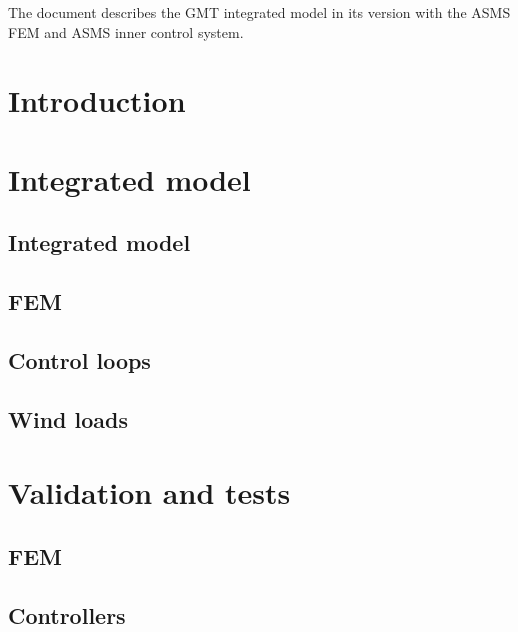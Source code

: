 \documentclass{gmto}
\begin{document}
The document describes the GMT integrated model in its version with the ASMS FEM
and ASMS inner control system.

\section{Introduction}
\label{sec:introduction}

\section{Integrated model}

\subsection{Integrated model}
\label{sec:im}

\subsection{FEM}
\label{sec:fem}








\subsection{Control loops}
\label{sec:ctrlr}






\subsection{Wind loads}
\label{sec:wind-loads}

\appendix

\section{Validation and tests}
\label{sec:tests}

\subsection{FEM}
\label{sec:fem-tests}

\subsection{Controllers}
\label{sec:ctrlr-tests}




\printbibliography
\end{document}
